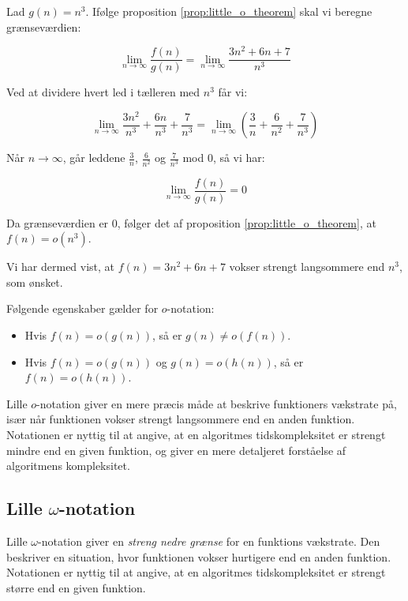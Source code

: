 \begin{solution}
    
    Lad \( g(n) = n^3 \). Ifølge proposition \ref{prop:little_o_theorem} skal vi beregne grænseværdien:
    
    \[
    \lim_{n \to \infty} \frac{f(n)}{g(n)} = \lim_{n \to \infty} \frac{3n^2 + 6n + 7}{n^3}
    \]
    
    Ved at dividere hvert led i tælleren med \( n^3 \) får vi:
    
    \[
    \lim_{n \to \infty} \frac{3n^2}{n^3} + \frac{6n}{n^3} + \frac{7}{n^3} = \lim_{n \to \infty} \left( \frac{3}{n} + \frac{6}{n^2} + \frac{7}{n^3} \right)
    \]
    
    Når \( n \to \infty \), går leddene \( \frac{3}{n} \), \( \frac{6}{n^2} \) og \( \frac{7}{n^3} \) mod \( 0 \), så vi har:
    
    \[
    \lim_{n \to \infty} \frac{f(n)}{g(n)} = 0
    \]
    
    Da grænseværdien er \( 0 \), følger det af proposition \ref{prop:little_o_theorem}, at \( f(n) = o(n^3) \).
    
    Vi har dermed vist, at \( f(n) = 3n^2 + 6n + 7 \) vokser strengt langsommere end \( n^3 \), som ønsket.
\end{solution}

Følgende egenskaber gælder for $o$-notation:
\begin{itemize}
    \item Hvis $f(n) = o(g(n))$, så er $g(n) \neq o(f(n))$.
    \item Hvis $f(n) = o(g(n))$ og $g(n) = o(h(n))$, så er $f(n) = o(h(n))$.
\end{itemize}

Lille $o$-notation giver en mere præcis måde at beskrive funktioners vækstrate på, især når funktionen vokser strengt langsommere end en anden funktion. Notationen er nyttig til at angive, at en algoritmes tidskompleksitet er strengt mindre end en given funktion, og giver en mere detaljeret forståelse af algoritmens kompleksitet.

\subsection*{Lille \texorpdfstring{$\omega$}{omega}-notation}
Lille $\omega$-notation giver en \textit{streng nedre grænse} for en funktions vækstrate. Den beskriver en situation, hvor funktionen vokser hurtigere end en anden funktion. Notationen er nyttig til at angive, at en algoritmes tidskompleksitet er strengt større end en given funktion.


